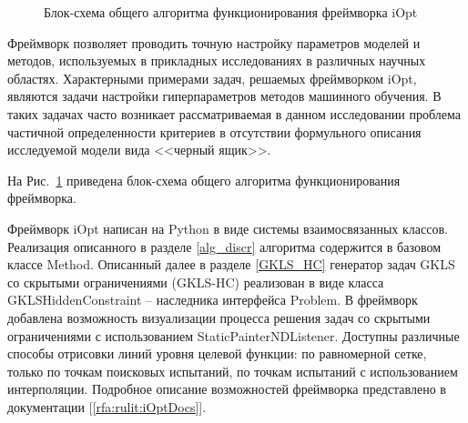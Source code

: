 \documentclass[a4paper,12pt,russian]{article}
\begin{document}
\begin{figure}[h!]
	\caption{Блок-схема общего алгоритма функционирования фреймворка iOpt}
	\label{fig_iOpt}
\end{figure}

Фреймворк позволяет проводить точную настройку параметров моделей и методов, используемых в прикладных исследованиях в различных научных областях. Характерными примерами задач, решаемых фреймворком iOpt, являются задачи настройки гиперпараметров методов машинного обучения. В таких задачах часто возникает рассматриваемая в данном исследовании проблема частичной определенности критериев в отсутствии формульного описания исследуемой модели вида <<черный ящик>>. 

На Рис.~\ref{fig_iOpt} приведена блок-схема общего алгоритма функционирования фреймворка.

Фреймворк iOpt написан на Python в виде системы взаимосвязанных классов. Реализация описанного в разделе \ref{alg_discr} алгоритма содержится в базовом классе Method. Описанный далее в разделе \ref{GKLS_HC} генератор задач GKLS со скрытыми ограничениями (GKLS-HC) реализован в виде класса GKLSHiddenConstraint -- наследника интерфейса Problem. В фреймворк добавлена возможность визуализации процесса решения задач со скрытыми ограничениями с использованием StaticPainterNDListener. Доступны различные способы отрисовки линий уровня целевой функции: по равномерной сетке, только по точкам поисковых испытаний, по точкам испытаний с использованием интерполяции. Подробное описание возможностей фреймворка представлено в документации [\ref{rfa:rulit:iOptDocs}].
\end{document}
